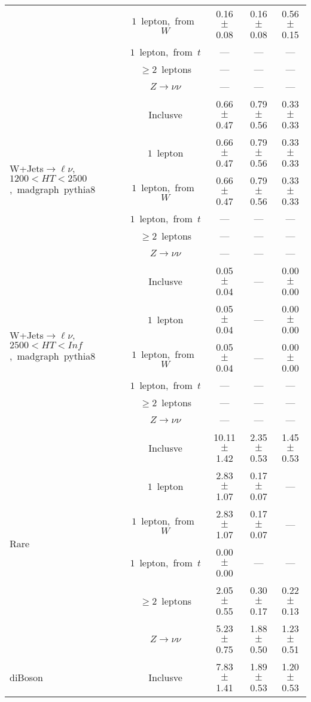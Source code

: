 \documentclass{article}
\begin{document}
\begin{longtable}{|l|c|c|c|c|}
 & $1$~lepton,~from~$W$  & 0.16 $\pm$ 0.08  & 0.16 $\pm$ 0.08  & 0.56 $\pm$ 0.15 \\* 
 & $1$~lepton,~from~$t$  & ---  & ---  & --- \\* 
 & $\ge2$~leptons  & ---  & ---  & --- \\* 
 & $Z\rightarrow\nu\nu$  & ---  & ---  & --- \\* 
\hline 
\multirow{6}{*}{W+Jets$\rightarrow\ell\nu$,~$1200<HT<2500$,~madgraph~pythia8} & Inclusve  & 0.66 $\pm$ 0.47  & 0.79 $\pm$ 0.56  & 0.33 $\pm$ 0.33 \\* 
 & $1$~lepton  & 0.66 $\pm$ 0.47  & 0.79 $\pm$ 0.56  & 0.33 $\pm$ 0.33 \\* 
 & $1$~lepton,~from~$W$  & 0.66 $\pm$ 0.47  & 0.79 $\pm$ 0.56  & 0.33 $\pm$ 0.33 \\* 
 & $1$~lepton,~from~$t$  & ---  & ---  & --- \\* 
 & $\ge2$~leptons  & ---  & ---  & --- \\* 
 & $Z\rightarrow\nu\nu$  & ---  & ---  & --- \\* 
\hline 
\multirow{6}{*}{W+Jets$\rightarrow\ell\nu$,~$2500<HT<Inf$,~madgraph~pythia8} & Inclusve  & 0.05 $\pm$ 0.04  & ---  & 0.00 $\pm$ 0.00 \\* 
 & $1$~lepton  & 0.05 $\pm$ 0.04  & ---  & 0.00 $\pm$ 0.00 \\* 
 & $1$~lepton,~from~$W$  & 0.05 $\pm$ 0.04  & ---  & 0.00 $\pm$ 0.00 \\* 
 & $1$~lepton,~from~$t$  & ---  & ---  & --- \\* 
 & $\ge2$~leptons  & ---  & ---  & --- \\* 
 & $Z\rightarrow\nu\nu$  & ---  & ---  & --- \\* 
\hline 
\multirow{6}{*}{Rare} & Inclusve  & 10.11 $\pm$ 1.42  & 2.35 $\pm$ 0.53  & 1.45 $\pm$ 0.53 \\* 
 & $1$~lepton  & 2.83 $\pm$ 1.07  & 0.17 $\pm$ 0.07  & --- \\* 
 & $1$~lepton,~from~$W$  & 2.83 $\pm$ 1.07  & 0.17 $\pm$ 0.07  & --- \\* 
 & $1$~lepton,~from~$t$  & 0.00 $\pm$ 0.00  & ---  & --- \\* 
 & $\ge2$~leptons  & 2.05 $\pm$ 0.55  & 0.30 $\pm$ 0.17  & 0.22 $\pm$ 0.13 \\* 
 & $Z\rightarrow\nu\nu$  & 5.23 $\pm$ 0.75  & 1.88 $\pm$ 0.50  & 1.23 $\pm$ 0.51 \\* 
\hline 
\multirow{6}{*}{diBoson} & Inclusve  & 7.83 $\pm$ 1.41  & 1.89 $\pm$ 0.53  & 1.20 $\pm$ 0.53 \\* 

\end{longtable}
\end{document}
